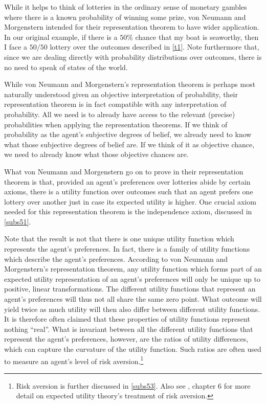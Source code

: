 While it helps to think of lotteries in the ordinary sense of monetary gambles where there is a known probability of winning some prize, von Neumann and Morgenstern intended for their representation theorem to have wider application. In our original example, if there is a $50\%$ chance that my boat is seaworthy, then I face a $50/50$ lottery over the outcomes described in \autoref{t1}. Note furthermore that, since we are dealing directly with probability distributions over outcomes, there is no need to speak of states of the world.

While von Neumann and Morgenstern's representation theorem is perhaps most naturally understood given an objective interpretation of probability, their representation theorem is in fact compatible with any interpretation of probability. All we need is to already have access to the relevant (precise) probabilities when applying the representation theorems. If we think of probability as the agent's subjective degrees of belief, we already need to know what those subjective degrees of belief are. If we think of it as objective chance, we need to already know what those objective chances are.

What von Neumann and Morgenstern go on to prove in their representation theorem is that, provided an agent's preferences over lotteries abide by certain axioms, there is a utility function over outcomes such that an agent prefers one lottery over another just in case its expected utility is higher. One crucial axiom needed for this representation theorem is the independence axiom, discussed in \autoref{subs51}.

Note that the result is not that there is one unique utility function which represents the agent's preferences. In fact, there is a family of utility functions which describe the agent's preferences. According to von Neumann and Morgenstern's representation theorem, any utility function which forms part of an expected utility representation of an agent's preferences will only be unique up to positive, linear transformations. The different utility functions that represent an agent's preferences will thus not all share the same zero point. What outcome will yield twice as much utility will then also differ between different utility functions. It is therefore often claimed that these properties of utility functions represent nothing ``real''. What is invariant between all the different utility functions that represent the agent's preferences, however, are the ratios of utility differences, which can capture the curvature of the utility function. Such ratios are often used to measure an agent's level of risk aversion.\footnote{Risk aversion is further discussed in \autoref{subs53}. Also see \citet{Mas-Colell1995}, chapter 6 for more detail on expected utility theory's treatment of risk aversion.}

